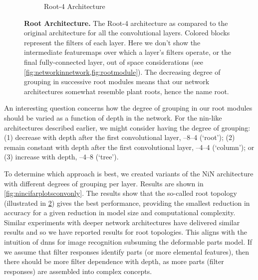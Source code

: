 \documentclass[thesis]{subfiles}
\begin{document}
{\begin{landscape}
\begin{figure}[p]
\begin{subfigure}[b]{0.98\linewidth}
			\caption{Root-4 Architecture}
			\label{fig:root4topology}
		\end{subfigure}
		\caption[ standard \vs root architecture]{\textbf{ Root Architecture.} The Root-4 architecture as compared to the original architecture for all the convolutional layers. Colored blocks represent the filters of each layer. Here we don't show the intermediate \glspl{featuremap} over which a layer's filters operate, or the final fully-connected layer, out of space considerations (see \cref{fig:networkinnetwork,fig:rootmodule}). The decreasing degree of grouping in successive root modules means that our network architectures somewhat resemble plant roots, hence the name root.
		}\label{fig:networktopology}
	\end{figure}
	\end{landscape}
	}
	An interesting question concerns how the degree of grouping in our root modules should be varied as a function of depth in the network. For the \gls{nin}-like architectures described earlier, we might consider having the degree of grouping: (1) decrease with depth after the first convolutional layer, --8--4 (`root'); (2) remain constant with depth after the first convolutional layer, --4--4 (`column'); or (3) increase with depth, --4--8 (`tree').
	
	To determine which approach is best, we created variants of the NiN architecture with different degrees of grouping per layer. Results are shown in \cref{fig:nincifarplotsconvonly}. The results show that the so-called root topology (illustrated in \cref{fig:networktopology}) gives the best performance, providing the smallest reduction in accuracy for a given reduction in model size and computational complexity. Similar experiments with deeper network architectures have delivered similar results and so we have reported results for root topologies. This aligns with the intuition of \glspl{dnn} for image recognition subsuming the deformable parts model. If we assume that filter responses identify parts (or more elemental features), then there should be more filter dependence with depth, as more parts (filter responses) are assembled into complex concepts.
	
\end{document}

